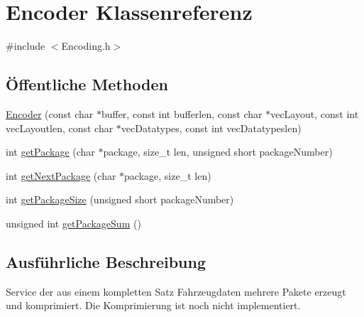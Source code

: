 \hypertarget{classEncoder}{\section{Encoder Klassenreferenz}
\label{classEncoder}
}


{\ttfamily \#include $<$Encoding.\-h$>$}

\subsection*{Öffentliche Methoden}
\begin{DoxyCompactItemize}
\item 
\hyperlink{classEncoder_ac957151409a5f04f3d3065d730decbed}{Encoder} (const char $\ast$buffer, const int bufferlen, const char $\ast$vec\-Layout, const int vec\-Layoutlen, const char $\ast$vec\-Datatypes, const int vec\-Datatypeslen)
\item 
int \hyperlink{classEncoder_a311f7e2d81ee27cf1c73c62bad1c046b}{get\-Package} (char $\ast$package, size\-\_\-t len, unsigned short package\-Number)
\item 
int \hyperlink{classEncoder_aebc183e41020b51fbbd054ecc448e83b}{get\-Next\-Package} (char $\ast$package, size\-\_\-t len)
\item 
int \hyperlink{classEncoder_ac2567f8f3c63f486f82758b4da51b660}{get\-Package\-Size} (unsigned short package\-Number)
\item 
unsigned int \hyperlink{classEncoder_a32406ccfc04e12f876f07be50c5b2c6b}{get\-Package\-Sum} ()
\end{DoxyCompactItemize}


\subsection{Ausführliche Beschreibung}
Service der aus einem kompletten Satz Fahrzeugdaten mehrere Pakete erzeugt und komprimiert. Die Komprimierung ist noch nicht implementiert. 

